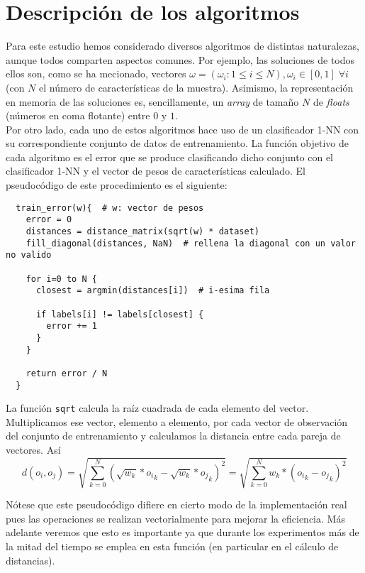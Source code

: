 \documentclass[11pt]{article}
\theoremstyle{plain}
\theoremstyle{definition}
\begin{document}
\section{Descripción de los algoritmos}

Para este estudio hemos considerado diversos algoritmos de distintas
naturalezas, aunque todos comparten aspectos comunes. Por ejemplo, las
soluciones de todos ellos son, como se ha mecionado, vectores $\omega
= (\omega_i : 1 \le i \le N), \omega_i \in [0, 1] \; \forall i$ (con
$N$ el número de características de la muestra). Asimismo, la
representación en memoria de las soluciones es, sencillamente, un
\textit{array} de tamaño $N$ de \textit{floats} (números en coma flotante) entre $0$
y $1$. \\

Por otro lado, cada uno de estos algoritmos hace uso de un
clasificador 1-NN con su correspondiente conjunto de datos de
entrenamiento. La función objetivo de cada algoritmo es el error que
se produce clasificando dicho conjunto con el clasificador 1-NN y el
vector de pesos de características calculado. El pseudocódigo de este
procedimiento es el siguiente: \\

\begin{lstlisting}
  train_error(w){  # w: vector de pesos
    error = 0
    distances = distance_matrix(sqrt(w) * dataset)
    fill_diagonal(distances, NaN)  # rellena la diagonal con un valor no valido

    for i=0 to N {
      closest = argmin(distances[i])  # i-esima fila

      if labels[i] != labels[closest] {
        error += 1
      }
    }

    return error / N
  }
\end{lstlisting}

La función \texttt{sqrt} calcula la raíz cuadrada de cada elemento del
vector. Multiplicamos ese vector, elemento a elemento, por cada vector
de observación del conjunto de entrenamiento y calculamos la distancia
entre cada pareja de vectores. Así \\

$$ d(o_i, o_j) = \sqrt{\sum_{k=0}^N (\sqrt{w_k} * {o_i}_k -
  \sqrt{w_k} * {o_j}_k)^2} = \sqrt{\sum_{k=0}^N w_k * ({o_i}_k -
  {o_j}_k)^2} $$

Nótese que este pseudocódigo difiere en cierto modo de la
implementación real pues las operaciones se realizan vectorialmente
para mejorar la eficiencia. Más adelante veremos que esto es
importante ya que durante los experimentos más de la mitad del tiempo
se emplea en esta función (en particular en el cálculo de distancias). \\
\end{document}
